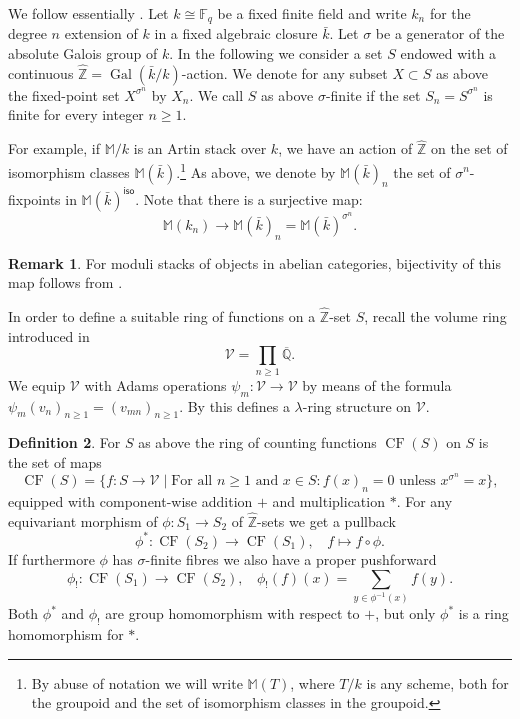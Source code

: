 \documentclass{article}
\DeclareMathOperator{\iso}{\mathsf{iso}}
\DeclareMathOperator{\Gal}{Gal}
\newcommand{\BF}{{\mathbb{F}}}
\newcommand{\BM}{{\mathbb{M}}}
\newcommand{\BQ}{{\mathbb{Q}}}
\newcommand{\CV}{{\mathcal V}}
\DeclareMathOperator{\mcf}{CF}
\theoremstyle{definition}
\newtheorem{definition}{Definition}[section]
\newtheorem{rmk}[definition]{Remark}
\theoremstyle{plain}
\begin{document}
We follow essentially \cite{Mo19}. Let $k \cong \BF_q$ be a fixed finite field and write $k_n$ for the degree $n$ extension of $k$ in a fixed algebraic closure $\bar{k}$. Let $\sigma$ be a generator of the absolute Galois group of $k$. In the following we consider a set $S$ endowed with a continuous $\widehat{\mathbb{Z}} = \Gal(\bar{k}/k)$-action. We denote for any subset $X \subset S$ as above the fixed-point set $X^{\sigma^n}$ by $X_n$.
We call $S$ as above $\sigma$-finite if the set $S_n = S^{\sigma^n}$ is finite for every integer $n \geq 1$.

For example, if $\BM /k$ is an Artin stack over $k$, we have an action of $\widehat{\mathbb{Z}}$ on the set of isomorphism classes $\BM(\bar{k}).$\footnote{By abuse of notation we will write $\BM(T)$, where $T/k$ is any scheme, both for the groupoid and the set of isomorphism classes in the groupoid.} 
As above, we denote by $\BM(\bar{k})_n$ the set of $\sigma^n$-fixpoints in $\BM(\bar{k})^{\iso}$. 
Note that there is a surjective map:
$$ \BM(k_n) \to \BM(\bar{k})_n =\BM(\bar{k})^{\sigma^n}.$$
\begin{rmk}\label{rmk:bij}
For moduli stacks of objects in abelian categories, bijectivity of this map follows from \cite[Lemmas 3.4 \& 3.5]{Mo19}.    
\end{rmk}


In order to define a suitable ring of functions on a $\widehat{\mathbb{Z}}$-set $S$, recall the volume ring introduced in \cite[Section 2.2]{Mo19} 
\[ \CV = \prod_{n\geq 1} \overline{\BQ}.\]
We equip $\CV$ with Adams operations $\psi_m:\CV \to \CV$ by means of the formula $\psi_m(v_n)_{n\geq 1} = (v_{mn})_{n\geq 1}$. By \cite[Remark 2.1]{Mo19} this defines a $\lambda$-ring structure on $\CV$.

\begin{definition} For $S$ as above the ring of counting functions $\mcf(S)$ on $S$ is the set of maps 
\[ \mcf(S) = \{f: S \to \CV \mid \text{For all } n\geq 1\text{ and } x \in S: f(x)_n=0 \text{ unless } x^{\sigma^n}=x\},  \]
equipped with component-wise addition $+$ and multiplication $*$. For any equivariant morphism of $\phi: S_1 \to S_2$ of $\widehat{\mathbb{Z}}$-sets we get a pullback 
\[ \phi^*:   \mcf(S_2) \rightarrow  \mcf(S_1), \ \ \ \ f \mapsto f \circ \phi.\]
If furthermore $\phi$ has $\sigma$-finite fibres we also have a proper pushforward 
\[ \phi_!:  \mcf(S_1) \rightarrow  \mcf(S_2), \ \ \ \ \phi_!(f)(x) = \sum_{y \in \phi^{-1}(x)} f(y). \]
Both $\phi^*$ and $\phi_!$ are group homomorphism with respect to $+$, but only $\phi^*$ is a ring homomorphism for $*$.
\end{definition}
\end{document}
